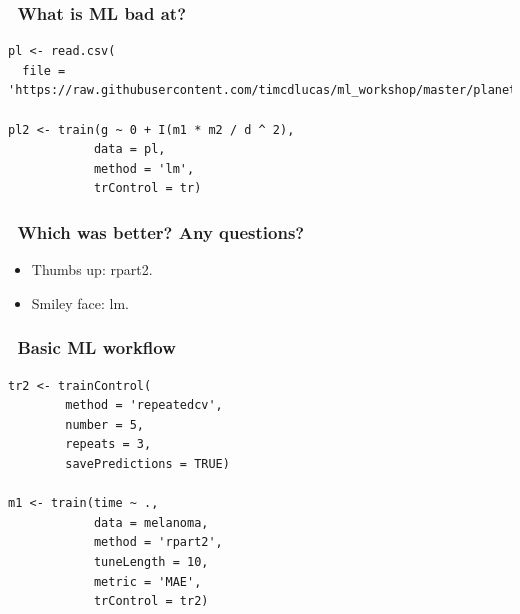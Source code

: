 \documentclass[handout, aspectratio = 169]{beamer}
\begin{document}
\begin{frame}[fragile]
\frametitle{\insertframenumber~What is ML bad at?}
\renewcommand{\FancyVerbFormatLine}[1]{%
   \ifnum\value{FancyVerbLine}=1\color{cyan}#1%
   \else #1\fi}
\begin{Verbatim}
pl <- read.csv(
  file = 'https://raw.githubusercontent.com/timcdlucas/ml_workshop/master/planets.csv')

pl2 <- train(g ~ 0 + I(m1 * m2 / d ^ 2), 
            data = pl,
            method = 'lm',
            trControl = tr)

\end{Verbatim}

\end{frame} 



\begin{frame}
\frametitle{\insertframenumber~Which was better? Any questions?}

\begin{itemize}
\item Thumbs up: rpart2.
\item Smiley face: lm.
\end{itemize}
\end{frame} 







\begin{frame}[fragile]
\frametitle{\insertframenumber~Basic ML workflow}
\begin{Verbatim}
tr2 <- trainControl(
        method = 'repeatedcv',
        number = 5,
        repeats = 3, 
        savePredictions = TRUE)

m1 <- train(time ~ ., 
            data = melanoma,
            method = 'rpart2',
            tuneLength = 10,
            metric = 'MAE',
            trControl = tr2)

\end{Verbatim}

\end{frame} 
\end{document}
